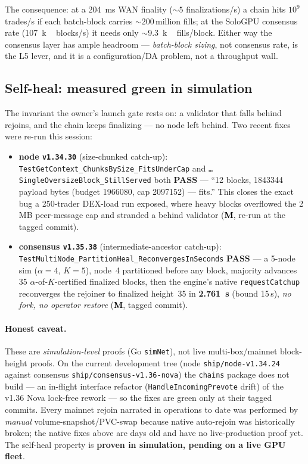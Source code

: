 \documentclass[11pt,a4paper]{article}
\newcommand{\Mnow}{\textbf{\textcolor{black}{M}}}      %
\begin{document}
The consequence: at a \SI{204}{ms} WAN finality (${\sim}5$ finalizations/s)
a chain hits $10^9$ trades/s if each batch-block carries
${\sim}200$\,million fills; at the SoloGPU consensus rate
(\SI{107}{k\,blocks/s}) it needs only ${\sim}$\SI{9.3}{k\,fills/block}.
Either way the consensus layer has ample headroom --- \emph{batch-block
sizing}, not consensus rate, is the L5 lever, and it is a
configuration/DA problem, not a throughput wall.

\subsection{Self-heal: measured green in simulation}\label{sec:selfheal}

The invariant the owner's launch gate rests on: a validator that falls
behind rejoins, and the chain keeps finalizing --- no node left behind.
Two recent fixes were re-run this session:

\begin{itemize}[leftmargin=2em,itemsep=1pt]
  \item \textbf{node \texttt{v1.34.30}} (size-chunked catch-up):
        \texttt{TestGetContext\_ChunksBySize\_FitsUnderCap} and
        \texttt{\ldots SingleOversizeBlock\_StillServed} both \textbf{PASS}
        --- ``12 blocks, \num{1843344} payload bytes (budget
        \num{1966080}, cap \num{2097152}) --- fits.'' This closes the
        exact bug a 250-trader DEX-load run exposed, where heavy blocks
        overflowed the 2\,MB peer-message cap and stranded a behind
        validator (\Mnow, re-run at the tagged commit).
  \item \textbf{consensus \texttt{v1.35.38}} (intermediate-ancestor
        catch-up): \texttt{TestMultiNode\_PartitionHeal\_Reconverges\-InSeconds}
        \textbf{PASS} --- a 5-node sim ($\alpha{=}4$, $K{=}5$),
        node~4 partitioned before any block, majority advances 35
        $\alpha$-of-$K$-certified finalized blocks, then the engine's
        native \texttt{requestCatchup} reconverges the rejoiner to
        finalized height~35 in \textbf{\SI{2.761}{s}} (bound 15\,s),
        \emph{no fork, no operator restore} (\Mnow, tagged commit).
\end{itemize}

\paragraph{Honest caveat.} These are \emph{simulation-level} proofs
(Go \texttt{simNet}), not live multi-box/mainnet block-height proofs. On
the current development tree (node \texttt{ship/node-v1.34.24} against
consensus \texttt{ship/consensus-v1.36-nova}) the \texttt{chains}
package does not build --- an in-flight interface refactor
(\texttt{HandleIncomingPrevote} drift) of the v1.36 Nova lock-free
rework --- so the fixes are green only at their tagged commits. Every
mainnet rejoin narrated in operations to date was performed by
\emph{manual} volume-snapshot/PVC-swap because native auto-rejoin was
historically broken; the native fixes above are days old and have no
live-production proof yet. The self-heal property is
\textbf{proven in simulation, pending on a live GPU fleet}.
\end{document}
